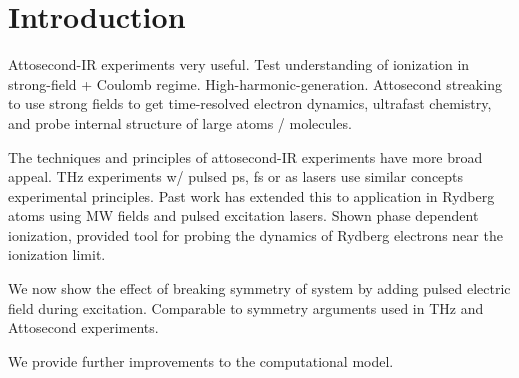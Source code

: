\documentclass[aps,pra,preprint,groupedaddress]{revtex4-1}
\begin{document}
\maketitle


\section{\label{sec:intro}Introduction}

Attosecond-IR experiments very useful. Test understanding of ionization in strong-field + Coulomb regime. High-harmonic-generation. Attosecond streaking to use strong fields to get time-resolved electron dynamics, ultrafast chemistry, and probe internal structure of large atoms / molecules.

The techniques and principles of attosecond-IR experiments have more broad appeal. THz experiments w/ pulsed ps, fs or as lasers use similar concepts experimental principles. Past work has extended this to application in Rydberg atoms using MW fields and pulsed excitation lasers. Shown phase dependent ionization, provided tool for probing the dynamics of Rydberg electrons near the ionization limit.

We now show the effect of breaking symmetry of system by adding pulsed electric field during excitation. Comparable to symmetry arguments used in THz and Attosecond experiments.

We provide further improvements to the computational model.
\end{document}
